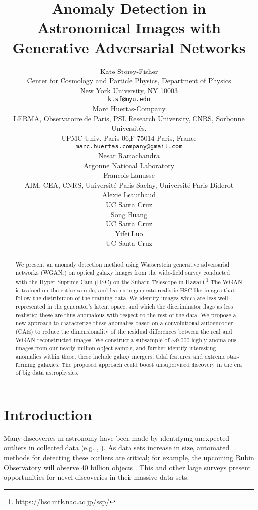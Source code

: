\documentclass{article}
\title{Anomaly Detection in Astronomical Images with Generative Adversarial Networks}
\author{%
    {Kate Storey-Fisher} \\
    Center for Cosmology and Particle Physics, Department of Physics \\
    New York University, NY 10003 \\
    \texttt{k.sf@nyu.edu} \\
    \And
    Marc Huertas-Company \\
    LERMA, Observatoire de Paris, PSL Research University, 
    CNRS, Sorbonne Universit\'es, \\
    UPMC Univ. Paris 06,F-75014 Paris, France \\
    \texttt{marc.huertas.company@gmail.com} \\
    \AND
    Nesar Ramachandra \\
    Argonne National Laboratory \\
    \And
    Francois Lanusse \\
    AIM, CEA, CNRS, Universit\'e Paris-Saclay, Universit\'e Paris Diderot \\
    \AND
    Alexie Leauthaud \\
    UC Santa Cruz \\
    \And
    Song Huang \\
    UC Santa Cruz \\
    \And
    Yifei Luo \\
    UC Santa Cruz \\
}
\begin{document}
\maketitle

\begin{abstract}
    We present an anomaly detection method using Wasserstein generative adversarial networks (WGANs) on optical galaxy images from the wide-field survey conducted with the Hyper Suprime-Cam (HSC) on the Subaru Telescope in Hawai'i.\footnote{\url{https://hsc.mtk.nao.ac.jp/ssp/}}
    The WGAN is trained on the entire sample, and learns to generate realistic HSC-like images that follow the distribution of the training data.
    We identify images which are less well-represented in the generator's latent space, and which the discriminator flags as less realistic; these are thus anomalous with respect to the rest of the data.
    We propose a new approach to characterize these anomalies based on a convolutional autoencoder (CAE) to reduce the dimensionality of the residual differences between the real and WGAN-reconstructed images.
    We construct a subsample of $\sim$9,000 highly anomalous images from our nearly million object sample, and further identify interesting anomalies within these; these include galaxy mergers, tidal features, and extreme star-forming galaxies.
    The proposed approach could boost unsupervised discovery in the era of big data astrophysics.
\end{abstract}


\section{Introduction}

Many discoveries in astronomy have been made by identifying unexpected outliers in collected data (e.g. \citealt{Cardamone2009}, \citealt{Massey2019}). 
As data sets increase in size, automated methods for detecting these outliers are critical; for example, the upcoming Rubin Observatory will observe 40 billion objects \citep{Ivezic2018}.
This and other large surveys present opportunities for novel discoveries in their massive data sets.
\end{document}
